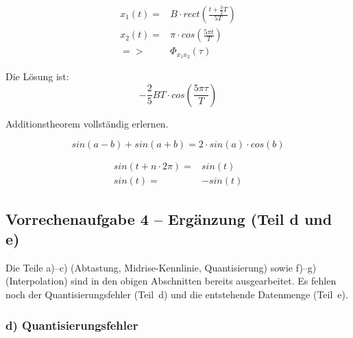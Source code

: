 $$
\begin{array}{rl}
x_1(t) = & B \cdot rect(\frac{t+\frac{3}{2}T}{5T}) \\
x_2(t) = & \pi \cdot cos(\frac{5 \pi t}{T}) \\
=>  & \Phi_{x_1x_2}(\tau)
\end{array}
$$

Die Lösung ist:
$$
- \frac{2}{5} BT \cdot cos(\frac{5 \pi \tau}{T})
$$

Additionstheorem vollständig erlernen.

$$
sin(a-b) + sin(a+b) = 2 \cdot sin(a) \cdot cos(b)
$$

$$
\begin{array}{rl}
    sin(t+n \cdot 2 \pi) = & sin(t) \\
    sin(t) = & -sin(t)
\end{array}
$$


\subsection*{Vorrechenaufgabe 4 – Ergänzung (Teil d und e)}

Die Teile a)–c) (Abtastung, Midrise-Kennlinie, Quantisierung) sowie f)–g)
(Interpolation) sind in den obigen Abschnitten bereits ausgearbeitet. Es fehlen
noch der Quantisierungsfehler (Teil~d) und die entstehende Datenmenge (Teil~e).

\subsubsection*{d) Quantisierungsfehler}

